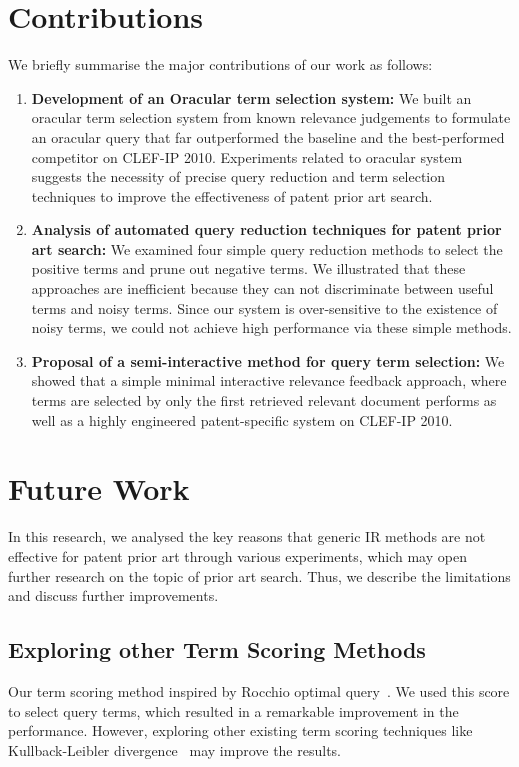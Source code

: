 \section{Contributions}
\label{sec:contributions}
We briefly summarise the major contributions of our work as follows:
\begin{enumerate}
\item \textbf{Development of an Oracular term selection system: }We built an oracular term selection system from known relevance judgements to formulate an oracular query that far outperformed the baseline and the best-performed competitor on CLEF-IP 2010. 
Experiments related to oracular system suggests the necessity of precise query
reduction and term selection techniques to improve the effectiveness of patent
prior art search.
\item \textbf{Analysis of automated query reduction techniques for patent prior art search: } We examined four simple query reduction methods to select the positive terms and prune out negative terms. We illustrated that these approaches are inefficient because they can not discriminate between useful terms and noisy terms. Since our system is over-sensitive to the existence of noisy terms, we could not achieve high performance via these simple methods. 
\item \textbf{Proposal of a semi-interactive method for query term selection: }We showed that a simple minimal interactive relevance feedback approach, where terms are selected by only the first retrieved relevant document performs as well as a highly engineered patent-specific system on CLEF-IP 2010. 
\end{enumerate}

\section{Future Work}
\label{sec:future}
In this research, we analysed the key reasons that generic IR methods are not effective for patent prior art through various experiments, which may open further research on the topic of prior art search. Thus, we describe the limitations and discuss further improvements. 
\subsection{Exploring other Term Scoring Methods}
\label{subsec:ExploringTermScoringMethods}
Our term scoring method inspired by Rocchio optimal query~\citep{manning2008introduction}. We used this score to select query terms, which resulted in a remarkable improvement in the performance. However, exploring other existing term scoring techniques like Kullback-Leibler divergence~\citep{Baeza-Yates2011} may improve the results.

